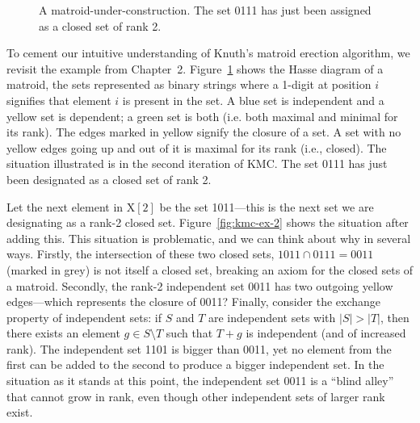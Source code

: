 \begin{figure}[ht!]
{
  }
  \caption{A matroid-under-construction. The set 0111 has just been assigned as a closed set of rank 2.}
  \label{fig:kmc-ex-1}
\end{figure}
To cement our intuitive understanding of Knuth's matroid erection algorithm, we revisit the example from Chapter~2. Figure~\ref{fig:kmc-ex-1} shows the Hasse diagram of a matroid, the sets represented as binary strings where a 1-digit at position $i$ signifies that element $i$ is present in the set. A blue set is independent and a yellow set is dependent; a green set is both (i.e. both maximal and minimal for its rank). The edges marked in yellow signify the closure of a set. A set with no yellow edges going up and out of it is maximal for its rank (i.e., closed). The situation illustrated is in the second iteration of KMC. The set 0111 has just been designated as a closed set of rank 2. 

Let the next element in $\mathrm{X}[2]$ be the set 1011---this is the next set we are designating as a rank-2 closed set. Figure~\ref{fig:kmc-ex-2} shows the situation after adding this. This situation is problematic, and we can think about why in several ways. Firstly, the intersection of these two closed sets, $1011\cap0111=0011$ (marked in grey) is not itself a closed set, breaking an axiom for the closed sets of a matroid. Secondly, the rank-2 independent set 0011 has two outgoing yellow edges---which represents the closure of 0011? Finally, consider the exchange property of independent sets: if $S$ and $T$ are independent sets with $|S|>|T|$, then there exists an element $g\in S\setminus T$ such that $T + g$ is independent (and of increased rank). The independent set 1101 is bigger than 0011, yet no element from the first can be added to the second to produce a bigger independent set. In the situation as it stands at this point, the independent set 0011 is a ``blind alley'' that cannot grow in rank, even though other independent sets of larger rank exist. 

